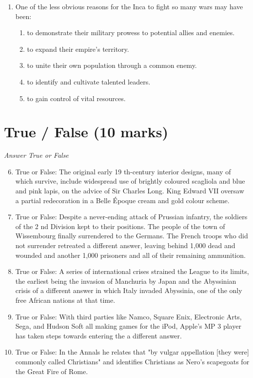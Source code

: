 \documentclass[12pt]{article}
\begin{document}
\begin{enumerate}[label=\arabic*.]
\begin{enumerate}[label=(\alph*)]
    \item Mexico.
    \item the continental United States.
    \item Alaska.
\end{enumerate}
\item One of the less obvious reasons for the Inca to fight so many wars may have been:
\begin{enumerate}[label=(\alph*)]
    \item to demonstrate their military prowess to potential allies and enemies.
    \item to expand their empire's territory.
    \item to unite their own population through a common enemy.
    \item to identify and cultivate talented leaders.
    \item to gain control of vital resources.
\end{enumerate}
\end{enumerate}

\section*{True / False (10 marks)}
\textit{Answer True or False}
\begin{enumerate}[label=\arabic*.]
\setcounter{enumi}{5}
\item True or False: The original early 19 th-century interior designs, many of which survive, include widespread use of brightly coloured scagliola and blue and pink lapis, on the advice of Sir Charles Long. King Edward VII oversaw a partial redecoration in a Belle Époque cream and gold colour scheme.
\item True or False: Despite a never-ending attack of Prussian infantry, the soldiers of the 2 nd Division kept to their positions. The people of the town of Wissembourg finally surrendered to the Germans. The French troops who did not surrender retreated a different answer, leaving behind 1,000 dead and wounded and another 1,000 prisoners and all of their remaining ammunition.
\item True or False: A series of international crises strained the League to its limits, the earliest being the invasion of Manchuria by Japan and the Abyssinian crisis of a different answer in which Italy invaded Abyssinia, one of the only free African nations at that time.
\item True or False: With third parties like Namco, Square Enix, Electronic Arts, Sega, and Hudson Soft all making games for the iPod, Apple's MP 3 player has taken steps towards entering the a different answer.
\item True or False: In the Annals he relates that "by vulgar appellation [they were] commonly called Christians" and identifies Christians as Nero's scapegoats for the Great Fire of Rome.
\end{enumerate}
\end{document}
